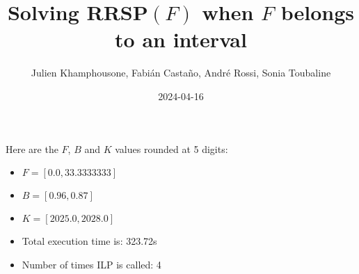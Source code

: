 \documentclass{article}
\begin{document}
     \title{Solving RRSP$(F)$ when $F$ belongs to an interval}
     \author{Julien Khamphousone, Fabi\'an Casta\~no, Andr\'e Rossi, Sonia Toubaline}
     \date{2024-04-16}
     \maketitle
     \def\F{{0.0,0.3333333,0.3666667}}
\def\gF{{20.25,20.57,2028.29}}

    Here are the $F$, $B$ and $K$ values rounded at 5 digits:

\begin{itemize}
	\item  $F = [0.0,33.3333333]$
 \item $B = [0.96,0.87]$
 \item  $K = [2025.0,2028.0]$\item Total execution time is: 323.72s\item Number of times ILP is called: 4\end{itemize}
\end{document}
